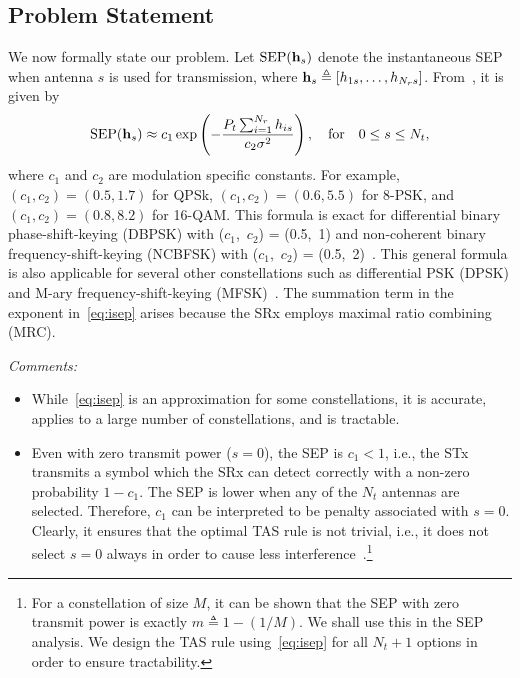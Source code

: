 \documentclass[12pt,draftcls,peerreview,onecolumn]{IEEEtran}
\newcommand{\define}{\triangleq}
\newcommand{\ie}{{i.e.}}
\newcommand{\SEP}{\text{SEP}}
\newcommand{\nx}{{0}}
\newcommand{\Nt}{{N_t}}
\newcommand{\Nr}{{N_r}}
\newcommand{\Pt}{{P_t}}
\newcommand{\such}{h}
\newcommand{\hk}[1]{{\such_{#1}}}
\newcommand{\noisevar}{\sigma^2}
\newcommand{\cone}{c_{1}}
\newcommand{\ctwo}{c_{2}}
\newcommand{\zerosep}{m}
\begin{document}
\subsection{Problem Statement}
We now formally state our problem. Let $\SEP(\hs)$ denote the instantaneous SEP when antenna $s$ is used for transmission, where $\hs\define\left[\hk{1s},\ldots,\hk{\Nr s} \right]$. From~\cite[(14)]{Chung_2001_TCom}, it is given by  
\begin{equation}
\SEP(\hs) \approx \cone \exp\left({-\frac{\Pt\sum_{i=1}^{\Nr}\hk{is}}{\ctwo\noisevar} }\right), \quad\text{for} \quad 0\leq s \leq \Nt,
\label{eq:isep}
\end{equation} 
where $\cone$ and $\ctwo$ are modulation specific constants. For example, $(\cone,\ctwo )=(0.5,1.7)$ for QPSk,  $(\cone,\ctwo)=(0.6,5.5)$ for 8-PSK, and  $(\cone,\ctwo )=(0.8,8.2)$ for 16-QAM.  This formula is exact for differential binary phase-shift-keying (DBPSK) with ($\cone$,~$\ctwo$) = (0.5,~1)  and non-coherent binary frequency-shift-keying (NCBFSK) with  ($\cone$,~$\ctwo$) = (0.5,~2)~\cite{Fakhan_2014_TSP}. This general formula is also applicable for several other constellations such as differential PSK (DPSK) and M-ary frequency-shift-keying (MFSK)~\cite{simon_alouini_book}. The summation term in the exponent in~\eqref{eq:isep} arises because the SRx employs maximal ratio combining (MRC).


{\em Comments:}
\begin{itemize}
\item While~\eqref{eq:isep} is an approximation for some constellations,  it is accurate, applies to a large number of constellations, and is tractable. %
\item Even with zero transmit power ($s=\nx$), the SEP is $\cone<1$, \ie, the STx transmits a symbol which the SRx can detect correctly with a non-zero probability $1-\cone$. The SEP is lower when any of the $\Nt$ antennas are selected. Therefore, $\cone$ can be interpreted to be penalty associated with $s=\nx$. Clearly, it ensures that the optimal TAS rule is not trivial, \ie, it does not select $s=\nx$  always in order to cause less interference~\cite{Kashyap_2014_TCOM,Sarvendranath_2013_TCOM}.\footnote{For a constellation of size $M$, it can be shown that the SEP with zero transmit power is exactly $\zerosep\define 1-\left(1/M\right)$. We shall use this in the SEP analysis. We design the TAS rule using~\eqref{eq:isep} for all $\Nt+1$ options in order to ensure tractability. } 	
\end{itemize}
\end{document}
